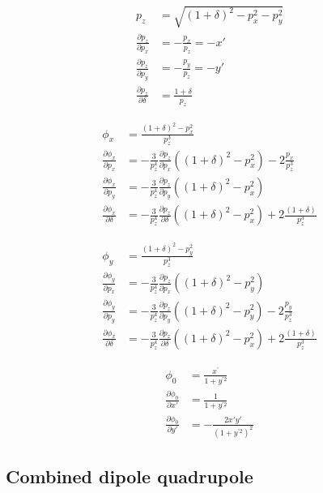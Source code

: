 \begin{align}
p_z &= \sqrt{(1+\delta)^2 - p_x^2 - p_y^2}\\
\frac{\partial p_z}{\partial p_x} &= -\frac{p_x}{p_z} = -x'\\
\frac{\partial p_z}{\partial p_y} &= -\frac{p_y}{p_z} = -y'\\
\frac{\partial p_z}{\partial \delta} &= \frac{1+\delta}{p_z}
\end{align}


\begin{align}
\phi_x &= \frac{(1+\delta)^2-p_x^2}{p_z^3}\\
\frac{\partial \phi_x}{\partial p_x} &=  -\frac{3}{p_z^4}\frac{\partial p_z}{\partial p_x} \left((1+\delta)^2-p_x^2 \right)
- 2 \frac{p_x}{p_z^3}\\
\frac{\partial \phi_x}{\partial p_y} &= -\frac{3}{p_z^4}\frac{\partial p_z}{\partial p_y} \left((1+\delta)^2-p_x^2 \right)\\
\frac{\partial \phi_x}{\partial \delta} &= -\frac{3}{p_z^4}\frac{\partial p_z}{\partial \delta} \left((1+\delta)^2-p_x^2 \right)
+ 2 \frac{(1+\delta)}{p_z^3}
\end{align}

\begin{align}
\phi_y &= \frac{(1+\delta)^2-p_y^2}{p_z^3}\\
\frac{\partial \phi_y}{\partial p_x} &=  -\frac{3}{p_z^4}\frac{\partial p_z}{\partial p_x} \left((1+\delta)^2-p_y^2 \right)\\
\frac{\partial \phi_y}{\partial p_y} &= -\frac{3}{p_z^4}\frac{\partial p_z}{\partial p_y} \left((1+\delta)^2-p_y^2 \right)
- 2 \frac{p_y}{p_z^3}\\
\frac{\partial \phi_x}{\partial \delta} &= -\frac{3}{p_z^4}\frac{\partial p_z}{\partial \delta} \left((1+\delta)^2-p_x^2 \right)
+ 2 \frac{(1+\delta)}{p_z^3}
\end{align}

\begin{align}
\phi_0 &= \frac{x^{\prime}}{1+y^{\prime 2}}\\
\frac{\partial \phi_0}{\partial x'} &= \frac{1}{1+y^{\prime 2}}\\
\frac{\partial \phi_0}{\partial y'} &= - \frac{2x'y'}{(1+y^{\prime 2})^2}
\end{align}



\subsection{Combined dipole quadrupole}

